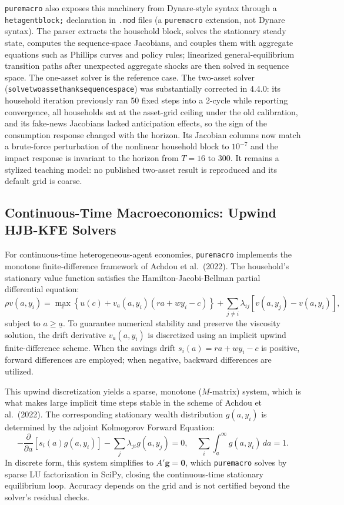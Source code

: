 \documentclass[11pt,letterpaper]{article}
\renewcommand{\_}{\pmunderscore\allowbreak}
\begin{document}
\texttt{puremacro} also exposes this machinery from Dynare-style syntax through a \texttt{hetagent\_block;} declaration in \texttt{.mod} files (a \texttt{puremacro} extension, not Dynare syntax). The parser extracts the household block, solves the stationary steady state, computes the sequence-space Jacobians, and couples them with aggregate equations such as Phillips curves and policy rules; linearized general-equilibrium transition paths after unexpected aggregate shocks are then solved in sequence space. The one-asset solver is the reference case. The two-asset solver (\texttt{solve\_two\_asset\_hank\_sequence\_space}) was substantially corrected in 4.4.0: its household iteration previously ran 50 fixed steps into a 2-cycle while reporting convergence, all households sat at the asset-grid ceiling under the old calibration, and its fake-news Jacobians lacked anticipation effects, so the sign of the consumption response changed with the horizon. Its Jacobian columns now match a brute-force perturbation of the nonlinear household block to \(10^{-7}\) and the impact response is invariant to the horizon from \(T = 16\) to 300. It remains a stylized teaching model: no published two-asset result is reproduced and its default grid is coarse.

\subsection{Continuous-Time Macroeconomics: Upwind HJB-KFE Solvers}\label{continuous-time-macroeconomics-upwind-hjb-kfe-solvers}

For continuous-time heterogeneous-agent economies, \texttt{puremacro} implements the monotone finite-difference framework of Achdou et al.~(2022). The household's stationary value function satisfies the Hamilton-Jacobi-Bellman partial differential equation:
\[\rho v(a, y_i) = \max_{c} \left\{ u(c) + v_a(a, y_i) (r a + w y_i - c) \right\} + \sum_{j \neq i} \lambda_{ij} \left[ v(a, y_j) - v(a, y_i) \right],\]
subject to \(a \ge \underline{a}\). To guarantee numerical stability and preserve the viscosity solution, the drift derivative \(v_a(a, y_i)\) is discretized using an implicit upwind finite-difference scheme. When the savings drift \(s_i(a) = r a + w y_i - c\) is positive, forward differences are employed; when negative, backward differences are utilized.

This upwind discretization yields a sparse, monotone (\(M\)-matrix) system, which is what makes large implicit time steps stable in the scheme of Achdou et al.~(2022). The corresponding stationary wealth distribution \(g(a, y_i)\) is determined by the adjoint Kolmogorov Forward Equation:
\[-\frac{\partial}{\partial a} \left[ s_i(a) g(a, y_i) \right] - \sum_{j} \lambda_{ji} g(a, y_j) = 0, \quad \sum_i \int_{\underline{a}}^\infty g(a, y_i) \, da = 1.\]
In discrete form, this system simplifies to \(A' \mathbf{g} = \mathbf{0}\), which \texttt{puremacro} solves by sparse LU factorization in SciPy, closing the continuous-time stationary equilibrium loop. Accuracy depends on the grid and is not certified beyond the solver's residual checks.
\end{document}
